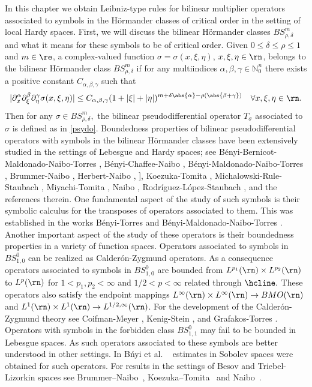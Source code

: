In this chapter we obtain Leibniz-type rules for bilinear multiplier operators associated to symbols in the H\"ormander classes of critical order in the setting of local Hardy spaces. First, we will discuss the bilinear H\"ormander classes $BS^m_{\rho,\delta}$ and what it means for these symbols to be of critical order. Given $0\leq \delta \leq \rho \leq 1$ and $m\in\re$, a complex-valued function $\sigma = \sigma(x,\xi,\eta)$, $x,\xi,\eta \in \rn$, belongs to the bilinear H\"ormander class $BS^m_{\rho,\delta}$ if for any multiindices $\alpha,\beta,\gamma \in \mathbb{N}^n_0$ there exists a positive constant $C_{\alpha,\beta,\gamma}$ such that 
\begin{equation}\label{def:Bmrd}
|\partial_x^\alpha \partial_\xi^\beta \partial_\eta^\gamma \sigma(x, \xi, \eta)| \leq C_{\alpha, \beta, \gamma} (1+|\xi|+|\eta|)^{m +\delta \abs{\alpha}-\rho(\abs{\beta+\gamma})} \quad \forall x, \xi, \eta \in \rn.
\end{equation}
Then for any $\sigma \in BS^m_{\rho,\delta},$ the bilinear pseudodifferential operator $T_\sigma$ associated to $\sigma$ is defined as in \ref{psydo}. Boundedness properties of bilinear pseudodifferential operators with symbols
in the bilinear H\"ormander classes have been extensively studied in the settings of
Lebesgue and Hardy spaces; see B\'enyi-Bernicot-Maldonado-Naibo-Torres \citep{MR2660466}, B\'enyi-Chaffee-Naibo \citep{benyi2018strongly}, B\'enyi-Maldonado-Naibo-Torres \citep{MR1986065, MR2660466}, Brummer-Naibo \citep{MR3750234}, Herbert-Naibo \citep{MR3627725}, \citep{MR3211086}], Koezuka-Tomita \citep{MR3750316}, Michalowski-Rule-Staubach \citep{MR3165300}, Miyachi-Tomita
\citep{MR3179688, MT1, MT2}, Naibo \cite{MR3393696, MR3411149}, Rodr\'iguez-L\'opez-Staubach \citep{MR3035059}, and the references therein. One fundamental aspect of the study of such symbols is their symbolic calculus for the transposes of operators associated to them. This was established in the works B\'enyi-Torres \citep{MR1986065} and B\'enyi-Maldonado-Naibo-Torres \citep{MR2660466}. Another important aspect of the study of these operators is their boundedness properties in a variety of function spaces. Operators associated to symbols in $BS^0_{1,0}$ can be realized as Calder\'on-Zygmund operators. As a consequence operators associated to symbols in $BS^0_{1,0}$ are bounded from $L^{p_1}(\rn) \times L^{p_2}(\rn)$ to  $L^p(\rn)$ for  $1 < p_1, p_2 < \infty$ and $1/2<p <\infty$ related through $\hcline.$ These operators also satisfy the endpoint mappings $L^\infty(\rn) \times L^\infty(\rn) \rightarrow BMO(\rn)$ and $L^1(\rn) \times L^1(\rn) \rightarrow L^{1/2, \infty}(\rn)$. For the development of the Calder\'on-Zygmund theory see Coifman-Meyer \citep{MR518170}, Kenig-Stein \citep{MR1713146}, and Grafakos-Torres \citep{MR1880324}. Operators with symbols in the forbidden class $BS^0_{1,1}$ may fail to be bounded in Lebesgue spaces. As such operators associated to these symbols are better understood in other settings. In B\'nyi et al. ~\cite{MR1996120, MR2250054, MR1986065} estimates in Sobolev spaces were obtained for such operators. For results in the settings of Besov and Triebel-Lizorkin spaces see Brummer--Naibo~\cite{MR3750234}, Koezuka--Tomita~\cite{MR3750316} and Naibo~\cite{MR3393696}.


